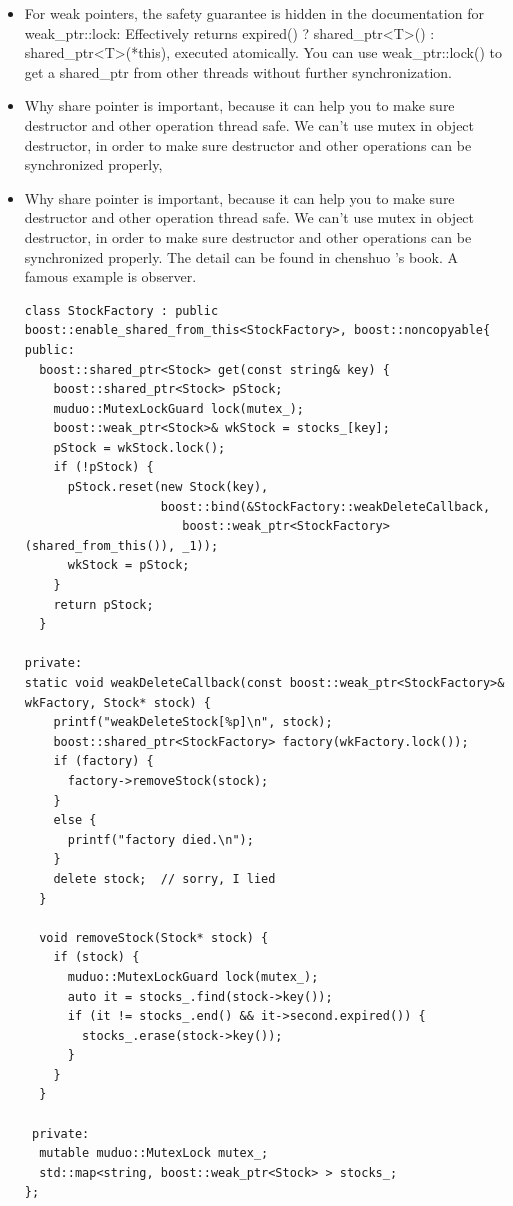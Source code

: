 \documentclass[a4paper,11pt,twoside]{book}
\begin{document}
\begin{itemize}
		\item For weak pointers, the safety guarantee is hidden in the documentation for weak\_ptr::lock: Effectively returns expired() ? shared\_ptr<T>() : shared\_ptr<T>(*this), executed atomically.  You can use weak\_ptr::lock() to get a shared\_ptr from other threads without further synchronization. 

		\item Why share pointer is important, because it can help you to make sure destructor and other operation thread safe. We can't use mutex in object destructor, in order to make sure destructor and other operations can be synchronized properly, 

		\item Why share pointer is important, because it can help you to make sure destructor and other operation thread safe. We can't use mutex in object destructor, in order to make sure destructor and other operations can be synchronized properly. The detail can be found in chenshuo 's book. A famous example is observer. 

\begin{lstlisting}
class StockFactory : public boost::enable_shared_from_this<StockFactory>, boost::noncopyable{
public:
  boost::shared_ptr<Stock> get(const string& key) {
    boost::shared_ptr<Stock> pStock;
    muduo::MutexLockGuard lock(mutex_);
    boost::weak_ptr<Stock>& wkStock = stocks_[key];
    pStock = wkStock.lock();
    if (!pStock) {
      pStock.reset(new Stock(key),
                   boost::bind(&StockFactory::weakDeleteCallback,
                      boost::weak_ptr<StockFactory>(shared_from_this()), _1));
      wkStock = pStock;
    }
    return pStock;
  }

private:
static void weakDeleteCallback(const boost::weak_ptr<StockFactory>& wkFactory, Stock* stock) {
    printf("weakDeleteStock[%p]\n", stock);
    boost::shared_ptr<StockFactory> factory(wkFactory.lock());
    if (factory) {
      factory->removeStock(stock);
    }
    else {
      printf("factory died.\n");
    }
    delete stock;  // sorry, I lied
  }

  void removeStock(Stock* stock) {
    if (stock) {
      muduo::MutexLockGuard lock(mutex_);
      auto it = stocks_.find(stock->key());
      if (it != stocks_.end() && it->second.expired()) {
        stocks_.erase(stock->key());
      }
    }
  }

 private:
  mutable muduo::MutexLock mutex_;
  std::map<string, boost::weak_ptr<Stock> > stocks_;
};
\end{lstlisting}


\end{itemize}
\end{document}
